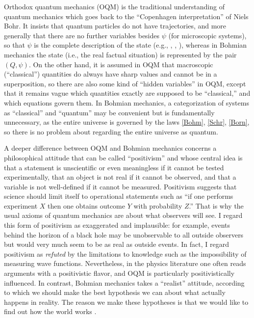 \documentclass[12pt]{article}
\begin{document}
Orthodox quantum mechanics (OQM) is the traditional understanding of quantum mechanics which goes back to the ``Copenhagen interpretation'' of Niels Bohr. It
insists that quantum particles do not have trajectories, and more generally that there are no further variables besides $\psi$ (for microscopic systems), so that $\psi$ is the complete description of the state (e.g., \cite{Bohr}, \cite[Chap.~III.2]{vN}, \cite[p.~5--6]{LL}), whereas in Bohmian mechanics the state (i.e., the real factual situation) is represented by the pair $(Q,\psi)$. On the other hand, it is assumed in OQM that macroscopic (``classical'') quantities do always have sharp values and cannot be in a superposition, so there are also some kind of ``hidden variables'' in OQM, except that it remains vague which quantities exactly are supposed to be ``classical,'' and which equations govern them. In Bohmian mechanics, a categorization of systems as ``classical'' and ``quantum'' may be convenient but is fundamentally unnecessary, as the entire universe is governed by the laws \eqref{Bohm}, \eqref{Schr}, \eqref{Born}, so there is no problem about regarding the entire universe as quantum.

A deeper difference between OQM and Bohmian mechanics concerns a philosophical attitude that can be called ``positivism'' and whose central idea is that a statement is unscientific or even meaningless if it cannot be tested experimentally, that an object is not real if it cannot be observed, and that a variable is not well-defined if it cannot be measured. Positivism suggests that science should limit itself to operational statements such as ``if one performs experiment $X$ then one obtains outcome $Y$ with probability $Z$.'' That is why the usual axioms of quantum mechanics are about what observers will see. I regard this form of positivism as exaggerated and implausible: for example, events behind the horizon of a black hole may be unobservable to all outside observers but would very much seem to be as real as outside events. In fact, I regard positivism as \emph{refuted} by the limitations to knowledge such as the impossibility of measuring wave functions. Nevertheless, in the physics literature one often reads arguments with a positivistic flavor, and OQM is particularly positivistically influenced. In contrast, Bohmian mechanics takes a ``realist'' attitude, according to which we should make the best hypothesis we can about what actually happens in reality. The reason we make these hypotheses is that we would like to find out how the world works \cite{Mau16}. 
\end{document}
